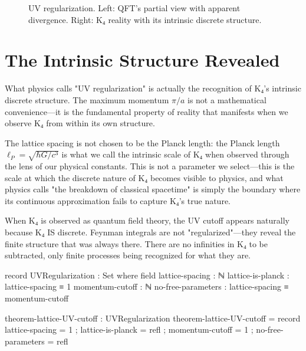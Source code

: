 \documentclass[11pt,a4paper]{book}
\begin{document}
\begin{figure}[h]
\caption{UV regularization. Left: QFT's partial view with apparent divergence. Right: K₄ reality with its intrinsic discrete structure.}
\label{fig:uv-regularization}
\end{figure}

\section{The Intrinsic Structure Revealed}

What physics calls "UV regularization" is actually the recognition of K₄'s intrinsic discrete structure. 
The maximum momentum $\pi/a$ is not a mathematical convenience—it is the fundamental property of reality 
that manifests when we observe K₄ from within its own structure.

The lattice spacing is not chosen to be the Planck length: the Planck length $\ell_P = \sqrt{\hbar G / c^3}$ 
is what we call the intrinsic scale of K₄ when observed through the lens of our physical constants. 
This is not a parameter we select—this is the scale at which the discrete nature of K₄ becomes 
visible to physics, and what physics calls "the breakdown of classical spacetime" is simply 
the boundary where its continuous approximation fails to capture K₄'s true nature.

When K₄ is observed as quantum field theory, the UV cutoff appears naturally because K₄ IS discrete. 
Feynman integrals are not "regularized"—they reveal the finite structure that was always there. 
There are no infinities in K₄ to be subtracted, only finite processes being recognized for what they are.

\begin{code}
record UVRegularization : Set where
  field
    lattice-spacing : ℕ
    lattice-is-planck : lattice-spacing ≡ 1
    momentum-cutoff : ℕ
    no-free-parameters : lattice-spacing ≡ momentum-cutoff

theorem-lattice-UV-cutoff : UVRegularization
theorem-lattice-UV-cutoff = record
  { lattice-spacing = 1
  ; lattice-is-planck = refl
  ; momentum-cutoff = 1
  ; no-free-parameters = refl
  }
\end{code}
\end{document}
